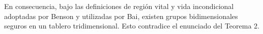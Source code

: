 En consecuencia, bajo las definiciones de región vital y vida incondicional adoptadas por Benson y utilizadas por Bai, existen grupos bidimensionales seguros en un tablero tridimensional. Esto contradice el enunciado del Teorema 2.




%

\clearpage